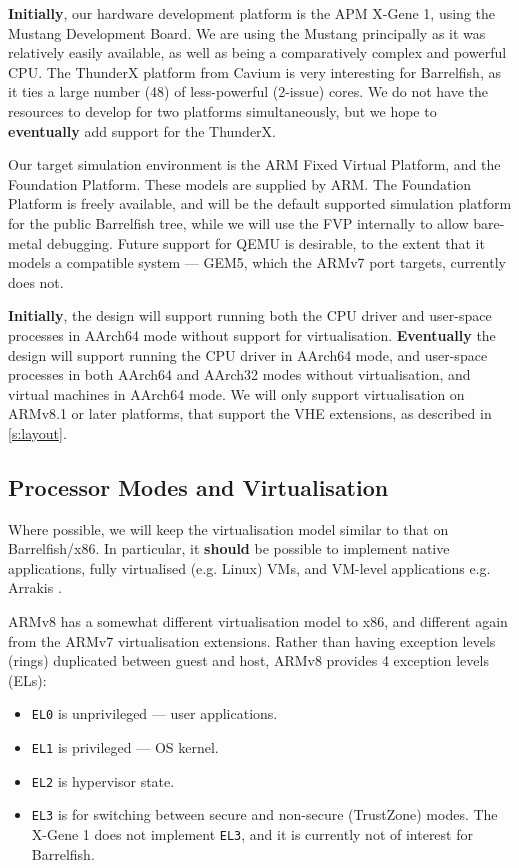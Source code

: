 \documentclass[a4paper,twoside]{report}
\def\qemu{QEMU\xspace}
\begin{document}
\textbf{Initially}, our hardware development platform is the APM X-Gene 1,
using the Mustang Development Board. We are using the Mustang principally as
it was relatively easily available, as well as being a comparatively complex
and powerful CPU. The ThunderX platform from Cavium is very interesting for
Barrelfish, as it ties a large number (48) of less-powerful (2-issue) cores.
We do not have the resources to develop for two platforms simultaneously, but
we hope to \textbf{eventually} add support for the ThunderX.

Our target simulation environment is the ARM Fixed Virtual Platform, and the
Foundation Platform. These models are supplied by ARM. The Foundation Platform
is freely available, and will be the default supported simulation platform for
the public Barrelfish tree, while we will use the FVP internally to allow
bare-metal debugging. Future support for \qemu is desirable, to the extent that
it models a compatible system --- GEM5, which the ARMv7 port targets,
currently does not.

\textbf{Initially}, the design will support running both the CPU driver and
user-space processes in AArch64 mode without support for virtualisation.
\textbf{Eventually} the design will support running the CPU driver in AArch64
mode, and user-space processes in both AArch64 and AArch32 modes without
virtualisation, and virtual machines in AArch64 mode. We will only support
virtualisation on ARMv8.1 or later platforms, that support the VHE extensions,
as described in \autoref{s:layout}.

\subsection{Processor Modes and Virtualisation}

Where possible, we will keep the virtualisation model similar to that on
Barrelfish/x86. In particular, it \textbf{should} be possible to implement
native applications, fully virtualised (e.g. Linux) VMs, and VM-level
applications e.g. Arrakis \citep{peter:osdi14}.

ARMv8 has a somewhat different virtualisation model to x86, and different
again from the ARMv7 virtualisation extensions. Rather than having exception
levels (rings) duplicated between guest and host, ARMv8 provides 4 exception
levels (ELs):

\begin{itemize}
\item \texttt{EL0} is unprivileged --- user applications.
\item \texttt{EL1} is privileged --- OS kernel.
\item \texttt{EL2} is hypervisor state.
\item \texttt{EL3} is for switching between secure and non-secure (TrustZone)
                   modes. The X-Gene 1 does not implement \texttt{EL3}, and it
                   is currently not of interest for Barrelfish.
\end{itemize}
\end{document}
